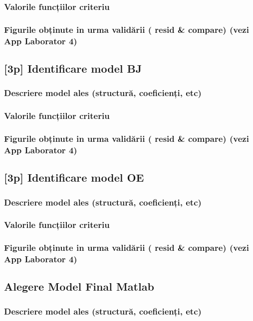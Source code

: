 \documentclass[12pt,english]{article}
\begin{document}
\subsubsection { Valorile funcțiilor criteriu }
\subsubsection { Figurile obținute in urma validării ( resid \& compare) (vezi App Laborator 4) }
\subsection { [3p] Identificare model BJ }
\subsubsection { Descriere model ales (structură, coeficienți, etc) }
\subsubsection { Valorile funcțiilor criteriu }
\subsubsection { Figurile obținute in urma validării ( resid \& compare) (vezi App Laborator 4) }
\subsection { [3p] Identificare model OE }
\subsubsection { Descriere model ales (structură, coeficienți, etc) }
\subsubsection { Valorile funcțiilor criteriu }
\subsubsection { Figurile obținute in urma validării ( resid \& compare) (vezi App Laborator 4) }
\subsection { Alegere Model Final Matlab }
\subsubsection { Descriere model ales (structură, coeficienți, etc) }
\end{document}

